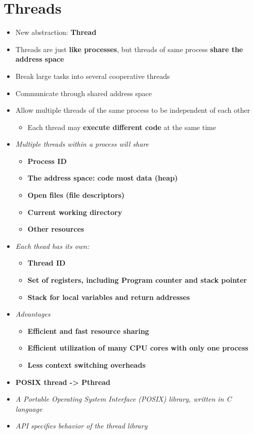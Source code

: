 \documentclass[a4paper,11pt,english]{article}
\begin{document}
\section*{Threads}
\begin{itemize}
    \item New abstraction: \textbf{\color{blue} Thread}
    \item Threads are just \textbf{\color{blue} like processes}, but threads of same process \textbf{\color{blue} share the address space}
    \item Break large tasks into several cooperative threads 
    \item Communicate through shared address space
    \item Allow multiple threads of the same process to be independent of each other
        \begin{itemize}
            \item Each thread may \textbf{\color{red} execute different code} at the same time
        \end{itemize}
    \item \textit{Multiple threads within a process will share}
        \begin{itemize}
            \item \textbf{\color{blue} Process ID}
            \item \textbf{\color{blue} The address space: code most data (heap)}
            \item \textbf{\color{blue} Open files (file descriptors)}
            \item \textbf{\color{blue} Current working directory}
            \item \textbf{\color{blue} Other resources}
        \end{itemize}
    \item \textit{Each thead has its own:}
        \begin{itemize}
            \item \textbf{\color{red} Thread ID}
            \item \textbf{\color{red} Set of registers, including Program counter and stack pointer}
            \item \textbf{\color{red} Stack for local variables and return addresses}
        \end{itemize}
    \item \textit{Advantages}
        \begin{itemize}
            \item \textbf{\color{blue} Efficient and fast resource sharing}
            \item \textbf{\color{blue} Efficient utilization of many CPU cores with only one process}
            \item \textbf{\color{blue} Less context switching overheads}
        \end{itemize}
    \item \textbf{\color{blue} POSIX thread -> Pthread}
    \item \textit{A Portable Operating System Interface (POSIX) library, written in C language}
    \item \textit{API specifies behavior of the thread library}
 
\end{itemize}
\end{document}
